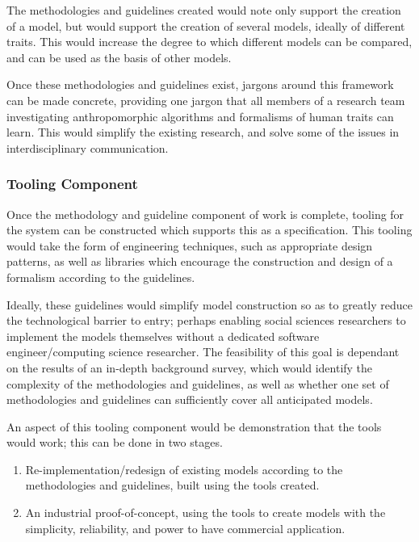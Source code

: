 The methodologies and guidelines created would note only support the creation of a model, but would support the creation of several models, ideally of different traits. This would increase the degree to which different models can be compared, and can be used as the basis of other models.\par

Once these methodologies and guidelines exist, jargons around this framework can be made concrete, providing one jargon that all members of a research team investigating anthropomorphic algorithms and formalisms of human traits can learn. This would simplify the existing research, and solve some of the issues in interdisciplinary communication.\par

\subsubsection*{Tooling Component}\label{sec:tooling}
Once the methodology and guideline component of work is complete, tooling for the system can be constructed which supports this as a specification. This tooling would take the form of engineering techniques, such as appropriate design patterns, as well as libraries which encourage the construction and design of a formalism according to the guidelines.\par

Ideally, these guidelines would simplify model construction so as to greatly reduce the technological barrier to entry; perhaps enabling social sciences researchers to implement the models themselves without a dedicated software engineer/computing science researcher. The feasibility of this goal is dependant on the results of an in-depth background survey, which would identify the complexity of the methodologies and guidelines, as well as whether one set of methodologies and guidelines can sufficiently cover all anticipated models.\par

An aspect of this tooling component would be demonstration that the tools would work; this can be done in two stages. 
\begin{enumerate}
    \item Re-implementation/redesign of existing models according to the methodologies and guidelines, built using the tools created.
    \item An industrial proof-of-concept, using the tools to create models with the simplicity, reliability, and power to have commercial application.
\end{enumerate}

